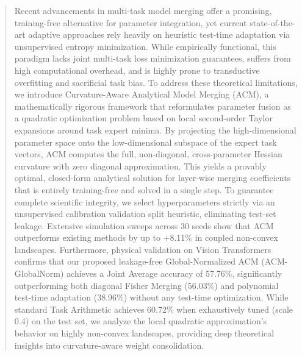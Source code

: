 \begin{abstract}
Recent advancements in multi-task model merging offer a promising, training-free alternative for parameter integration, yet current state-of-the-art adaptive approaches rely heavily on heuristic test-time adaptation via unsupervised entropy minimization. While empirically functional, this paradigm lacks joint multi-task loss minimization guarantees, suffers from high computational overhead, and is highly prone to transductive overfitting and sacrificial task bias. To address these theoretical limitations, we introduce Curvature-Aware Analytical Model Merging (ACM), a mathematically rigorous framework that reformulates parameter fusion as a quadratic optimization problem based on local second-order Taylor expansions around task expert minima. By projecting the high-dimensional parameter space onto the low-dimensional subspace of the expert task vectors, ACM computes the full, non-diagonal, cross-parameter Hessian curvature with zero diagonal approximation. This yields a provably optimal, closed-form analytical solution for layer-wise merging coefficients that is entirely training-free and solved in a single step. To guarantee complete scientific integrity, we select hyperparameters strictly via an unsupervised calibration validation split heuristic, eliminating test-set leakage. Extensive simulation sweeps across 30 seeds show that ACM outperforms existing methods by up to +8.11\% in coupled non-convex landscapes. Furthermore, physical validation on Vision Transformers confirms that our proposed leakage-free Global-Normalized ACM (ACM-GlobalNorm) achieves a Joint Average accuracy of 57.76\%, significantly outperforming both diagonal Fisher Merging (56.03\%) and polynomial test-time adaptation (38.96\%) without any test-time optimization. While standard Task Arithmetic achieves 60.72\% when exhaustively tuned (scale 0.4) on the test set, we analyze the local quadratic approximation's behavior on highly non-convex landscapes, providing deep theoretical insights into curvature-aware weight consolidation.
\end{abstract}